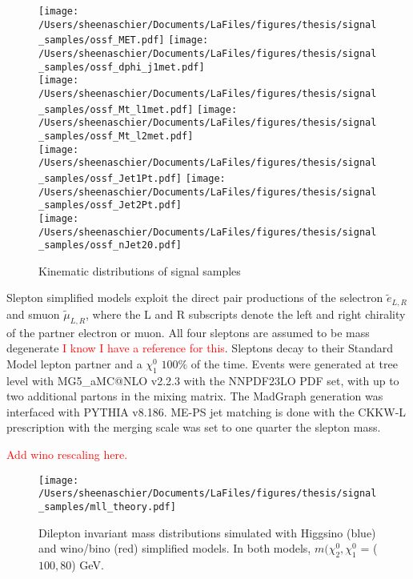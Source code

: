    \begin{figure}[tbp]
     \texttt{[image: /Users/sheenaschier/Documents/LaFiles/figures/thesis/signal\_samples/ossf\_MET.pdf]}
      \texttt{[image: /Users/sheenaschier/Documents/LaFiles/figures/thesis/signal\_samples/ossf\_dphi\_j1met.pdf]}\\
         \texttt{[image: /Users/sheenaschier/Documents/LaFiles/figures/thesis/signal\_samples/ossf\_Mt\_l1met.pdf]}
 \texttt{[image: /Users/sheenaschier/Documents/LaFiles/figures/thesis/signal\_samples/ossf\_Mt\_l2met.pdf]}\\
 \texttt{[image: /Users/sheenaschier/Documents/LaFiles/figures/thesis/signal\_samples/ossf\_Jet1Pt.pdf]}
\texttt{[image: /Users/sheenaschier/Documents/LaFiles/figures/thesis/signal\_samples/ossf\_Jet2Pt.pdf]}\\
  \texttt{[image: /Users/sheenaschier/Documents/LaFiles/figures/thesis/signal\_samples/ossf\_nJet20.pdf]}

 
   \caption{Kinematic distributions of signal samples}
   \label{fig:SigSample2}
 \end{figure}

\FloatBarrier
 
Slepton simplified models exploit the direct pair productions of the selectron $\tilde{e}_{L,R}$ and smuon $\tilde{\mu}_{L,R}$, where the L and R subscripts denote the left and right chirality of the partner electron or muon.  All four sleptons are assumed to be mass degenerate \textcolor{red} {I know I have a reference for this}.  Sleptons decay to their Standard Model lepton partner and a $\chi_1^0$ $100\%$ of the time.  Events were generated at tree level with MG5\_aMC@NLO v2.2.3 with the NNPDF23LO PDF set, with up to two additional partons in the mixing matrix.  The MadGraph generation was interfaced with PYTHIA v8.186.  ME-PS jet matching  is done with the CKKW-L prescription with the merging scale was set to one quarter the slepton mass.
 \FloatBarrier
 
  
 \textcolor{red}{Add wino rescaling here.}
 
\begin{figure}[tbp]
    \centering
 \texttt{[image: /Users/sheenaschier/Documents/LaFiles/figures/thesis/signal\_samples/mll\_theory.pdf]}
 \caption{Dilepton invariant mass distributions simulated with Higgsino (blue) and wino/bino (red) simplified models.  In both models, $m(\chi_2^0, \chi_1^0$ = ($100, 80$) GeV.}
\label{fig:samples:invMass}
\end{figure}
 \FloatBarrier
 
